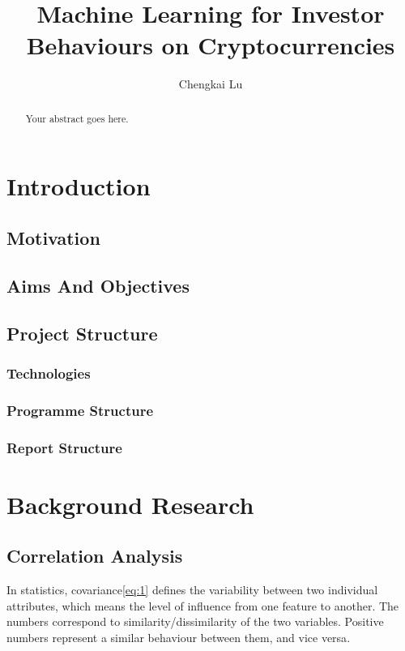 \documentclass[11pt]{article} %
\title{Machine Learning for Investor Behaviours on Cryptocurrencies}
\author{Chengkai Lu}
\theoremstyle{plain}
\theoremstyle{definition}
\begin{document}
\maketitle

\declaration

\begin{abstract}
  Your abstract goes here.
\end{abstract}

\listoffigures
\listoftables

\clearpage

\section{Introduction}
\subsection{Motivation}
\subsection{Aims And Objectives}
\subsection{Project Structure}
\subsubsection{Technologies}
\subsubsection{Programme Structure}
\subsubsection{Report Structure}

\section{Background Research}
\subsection{Correlation Analysis}

In statistics, covariance\eqref{eq:1} defines the variability between two individual attributes, which means the level of influence from one feature to another. The numbers correspond to similarity/dissimilarity of the two variables. Positive numbers represent a similar behaviour between them, and vice versa\cite{wiki/cov:2018}.
\end{document}
